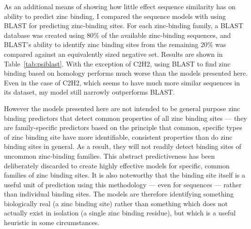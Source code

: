 As an additional means of showing how little effect sequence similarity has on ability to predict zinc binding, I compared the sequence models with using BLAST for predicting zinc-binding sites. For each zinc-binding family, a BLAST database was created using 80\% of the available zinc-binding sequences, and BLAST's ability
to identify zinc binding sites from the remaining 20\% was compared against an equivalently sized negative set. Results are shown in Table~\ref{tab:psiblast}. With the exception of C2H2, using BLAST to find zinc binding based on homology performs much worse than the models presented here. Even in the case of C2H2, which seems to have much more similar sequences in its dataset, my model still narrowly outperforms BLAST.

However the models presented here are not intended to be general purpose zinc binding predictors that detect common properties of all zinc binding sites --- they are family-specific predictors based on the principle that common, specific types of zinc binding site have more identifiable, consistent properties than do zinc binding sites in general. As a result, they will not readily detect binding sites of uncommon zinc-binding families. This abstract predictiveness has been deliberately discarded to create highly effective models for specific, common families of zinc binding sites. It is also noteworthy that the binding site itself is a useful unit of prediction using this
methodology --- even for sequences --- rather than individual binding sites. The models are therefore identifying something biologically real (a zinc binding site) rather than something which does not actually exist in isolation (a single zinc binding residue), but which is a useful heuristic in some circumstances.


